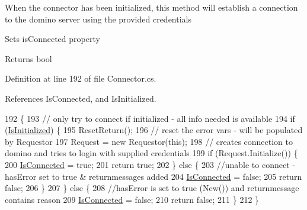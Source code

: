 When the connector has been initialized, this method will establish a connection to the domino server using the provided credentials 

Sets is\+Connected property

\begin{DoxyReturn}{Returns}
bool
\end{DoxyReturn}


Definition at line 192 of file Connector.\+cs.



References Is\+Connected, and Is\+Initialized.


\begin{DoxyCode}
192                           \{
193         \textcolor{comment}{// only try to connect if initialized - all info needed is available}
194         \textcolor{keywordflow}{if} (\mbox{\hyperlink{class_connector_ae9cbe0b51d601dab13ba7271db4f3883}{IsInitialized}}) \{
195             ResetReturn();
196             \textcolor{comment}{// reset the error vars - will be populated by Requestor}
197             Request = \textcolor{keyword}{new} Requestor(\textcolor{keyword}{this});
198             \textcolor{comment}{// creates connection to domino and tries to login with supplied credentials}
199             \textcolor{keywordflow}{if} (Request.Initialize()) \{
200                 \mbox{\hyperlink{class_connector_a7e4bd5a6b59b228b169066b5f5ed4b0a}{IsConnected}} = \textcolor{keyword}{true};
201                 \textcolor{keywordflow}{return} \textcolor{keyword}{true};
202             \} \textcolor{keywordflow}{else} \{
203                 \textcolor{comment}{//unable to connect - hasError set to true & returnmessages added}
204                 \mbox{\hyperlink{class_connector_a7e4bd5a6b59b228b169066b5f5ed4b0a}{IsConnected}} = \textcolor{keyword}{false};
205                 \textcolor{keywordflow}{return} \textcolor{keyword}{false};
206             \}
207         \} \textcolor{keywordflow}{else} \{
208             \textcolor{comment}{//hasError is set to true (New()) and returnmessage contains reason}
209             \mbox{\hyperlink{class_connector_a7e4bd5a6b59b228b169066b5f5ed4b0a}{IsConnected}} = \textcolor{keyword}{false};
210             \textcolor{keywordflow}{return} \textcolor{keyword}{false};
211         \}
212     \}
\end{DoxyCode}
\mbox{\label{class_connector_a5d089c1639f255966f00b2b05add0993}} 
